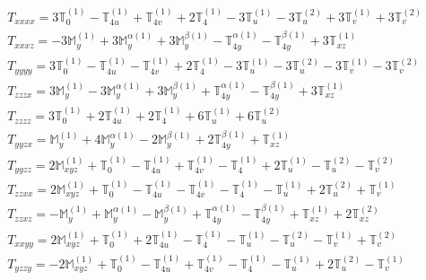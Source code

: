 \documentclass[fleqn,8pt,landscape]{jsarticle}
\begin{document}
\begin{align*}
& T_{xxxx} = 3 \mathbb{T}_{0}^{(1)} - \mathbb{T}_{4u}^{(1)} + \mathbb{T}_{4v}^{(1)} + 2 \mathbb{T}_{4}^{(1)} - 3 \mathbb{T}_{u}^{(1)} - 3 \mathbb{T}_{u}^{(2)} + 3 \mathbb{T}_{v}^{(1)} + 3 \mathbb{T}_{v}^{(2)} \\
& T_{xxxz} = - 3 \mathbb{M}_{y}^{(1)} + 3 \mathbb{M}_{y}^{\alpha(1)} + 3 \mathbb{M}_{y}^{\beta(1)} - \mathbb{T}_{4y}^{\alpha(1)} - \mathbb{T}_{4y}^{\beta(1)} + 3 \mathbb{T}_{xz}^{(1)} \\
& T_{yyyy} = 3 \mathbb{T}_{0}^{(1)} - \mathbb{T}_{4u}^{(1)} - \mathbb{T}_{4v}^{(1)} + 2 \mathbb{T}_{4}^{(1)} - 3 \mathbb{T}_{u}^{(1)} - 3 \mathbb{T}_{u}^{(2)} - 3 \mathbb{T}_{v}^{(1)} - 3 \mathbb{T}_{v}^{(2)} \\
& T_{zzzx} = 3 \mathbb{M}_{y}^{(1)} - 3 \mathbb{M}_{y}^{\alpha(1)} + 3 \mathbb{M}_{y}^{\beta(1)} + \mathbb{T}_{4y}^{\alpha(1)} - \mathbb{T}_{4y}^{\beta(1)} + 3 \mathbb{T}_{xz}^{(1)} \\
& T_{zzzz} = 3 \mathbb{T}_{0}^{(1)} + 2 \mathbb{T}_{4u}^{(1)} + 2 \mathbb{T}_{4}^{(1)} + 6 \mathbb{T}_{u}^{(1)} + 6 \mathbb{T}_{u}^{(2)} \\
& T_{yyzx} = \mathbb{M}_{y}^{(1)} + 4 \mathbb{M}_{y}^{\alpha(1)} - 2 \mathbb{M}_{y}^{\beta(1)} + 2 \mathbb{T}_{4y}^{\beta(1)} + \mathbb{T}_{xz}^{(1)} \\
& T_{yyzz} = 2 \mathbb{M}_{xyz}^{(1)} + \mathbb{T}_{0}^{(1)} - \mathbb{T}_{4u}^{(1)} + \mathbb{T}_{4v}^{(1)} - \mathbb{T}_{4}^{(1)} + 2 \mathbb{T}_{u}^{(1)} - \mathbb{T}_{u}^{(2)} - \mathbb{T}_{v}^{(2)} \\
& T_{zzxx} = 2 \mathbb{M}_{xyz}^{(1)} + \mathbb{T}_{0}^{(1)} - \mathbb{T}_{4u}^{(1)} - \mathbb{T}_{4v}^{(1)} - \mathbb{T}_{4}^{(1)} - \mathbb{T}_{u}^{(1)} + 2 \mathbb{T}_{u}^{(2)} + \mathbb{T}_{v}^{(1)} \\
& T_{zzxz} = - \mathbb{M}_{y}^{(1)} + \mathbb{M}_{y}^{\alpha(1)} - \mathbb{M}_{y}^{\beta(1)} + \mathbb{T}_{4y}^{\alpha(1)} - \mathbb{T}_{4y}^{\beta(1)} + \mathbb{T}_{xz}^{(1)} + 2 \mathbb{T}_{xz}^{(2)} \\
& T_{xxyy} = 2 \mathbb{M}_{xyz}^{(1)} + \mathbb{T}_{0}^{(1)} + 2 \mathbb{T}_{4u}^{(1)} - \mathbb{T}_{4}^{(1)} - \mathbb{T}_{u}^{(1)} - \mathbb{T}_{u}^{(2)} - \mathbb{T}_{v}^{(1)} + \mathbb{T}_{v}^{(2)} \\
& T_{yzzy} = - 2 \mathbb{M}_{xyz}^{(1)} + \mathbb{T}_{0}^{(1)} - \mathbb{T}_{4u}^{(1)} + \mathbb{T}_{4v}^{(1)} - \mathbb{T}_{4}^{(1)} - \mathbb{T}_{u}^{(1)} + 2 \mathbb{T}_{u}^{(2)} - \mathbb{T}_{v}^{(1)} \\

\end{align*}
\end{document}
